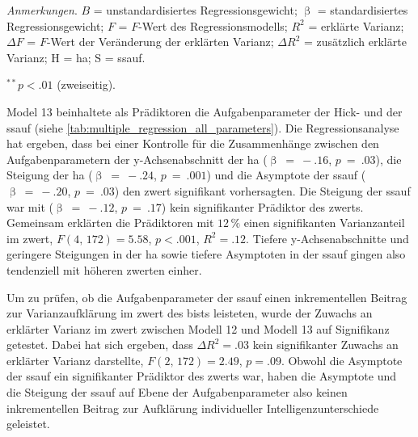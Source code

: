 \documentclass[11pt, twoside, a4paper]{book}		%
\begin{document}
\begin{table}[htbp]
\begin{adjustbox}{width=1\textwidth}
\begin{threeparttable}
		\begin{tablenotes}[flushleft]
			\footnotesize				%
			\setlength{}	%
			\item \textit{Anmerkungen}. $B$ = unstandardisiertes Regressionsgewicht; $\upbeta$ = standardisiertes Regressionsgewicht; $F$ = $F$-Wert des Regressionsmodells; $R^2$ = erklärte Varianz; $\Delta F$ = $F$-Wert der Veränderung der erklärten Varianz; $\Delta R^2$ = zusätzlich erklärte Varianz; H = \gls{ha}; S = \gls{ssauf}.
			\item {$^{**}$}$p<.01$ (zweiseitig).
		\end{tablenotes}
	\end{threeparttable}
	\end{adjustbox}
\end{table}

Model 13 beinhaltete als Prädiktoren die Aufgabenparameter der Hick- und der \gls{ssauf} (siehe \autoref{tab:multiple_regression_all_parameters}). 
Die Regressionsanalyse hat ergeben, dass bei einer Kontrolle für die Zusammenhänge zwischen den Aufgabenparametern der y-Ach\-sen\-ab\-schnitt der \gls{ha}  ($\upbeta~=~-.16$, $p~=~.03$), die Steigung der \gls{ha} ($\upbeta~=~-.24$, $p~=~.001$) und die Asymptote der \gls{ssauf} ($\upbeta~=~-.20$, $p~=~.03$) den \gls{zwert} signifikant vorhersagten. Die Steigung der \gls{ssauf} war mit ($\upbeta~=~-.12$, $p~=~.17$) kein signifikanter Prädiktor des \gls{zwert}s.
Gemeinsam erklärten die Prädiktoren mit $12\,\%$ einen signifikanten Varianzanteil im \gls{zwert}, $F(4,\,172)=5.58$, $p<.001$, $R^2=.12$. 
Tiefere y-Ach\-sen\-ab\-schnitte und geringere Steigungen in der \gls{ha} sowie tiefere Asymptoten in der \gls{ssauf} gingen also tendenziell mit höheren \gls{zwert}en einher.

Um zu prüfen, ob die Aufgabenparameter der \gls{ssauf} einen inkrementellen Beitrag zur Varianzaufklärung im \gls{zwert} des \gls{bist}s leisteten, wurde der Zuwachs an erklärter Varianz im \gls{zwert} zwischen Modell 12 und Modell 13 auf Signifikanz getestet. 
Dabei hat sich ergeben, dass $\Delta R^2=.03$ kein signifikanter Zuwachs an erklärter Varianz darstellte, $F(2,\,172)=2.49$, $p=.09$.
Obwohl die Asymptote der \gls{ssauf} ein signifikanter Prädiktor des \gls{zwert}s war, haben die Asymptote und die Steigung der \gls{ssauf} auf Ebene der Aufgabenparameter also keinen inkrementellen Beitrag zur Aufklärung individueller Intelligenzunterschiede geleistet.
\end{document}
